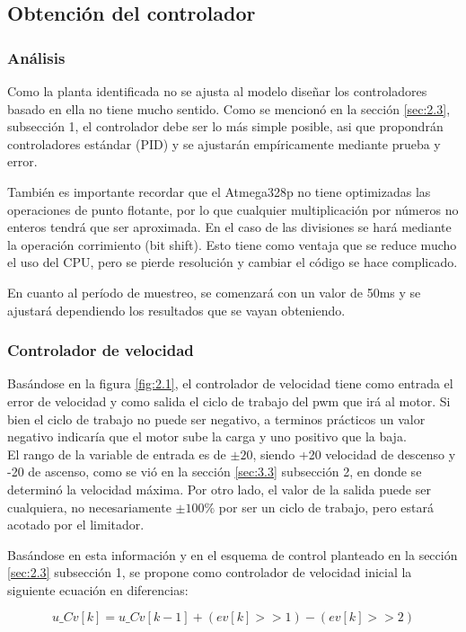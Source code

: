 \subsection{Obtención del controlador}
\subsubsection{Análisis}
Como la planta identificada no se ajusta al modelo diseñar los controladores basado en ella no tiene mucho sentido. Como se mencionó en la sección \ref{sec:2.3}, subsección 1, el controlador debe ser lo más simple posible, asi que propondrán controladores estándar (PID) y se ajustarán empíricamente mediante prueba y error.

También es importante recordar que el Atmega328p no tiene optimizadas las operaciones de punto flotante, por lo que cualquier multiplicación por números no enteros tendrá que ser aproximada. En el caso de las divisiones se hará mediante la operación corrimiento (bit shift). Esto tiene como ventaja que se reduce mucho el uso del CPU, pero se pierde resolución y cambiar el código se hace complicado.

En cuanto al período de muestreo, se comenzará con un valor de 50ms y se ajustará dependiendo los resultados que se vayan obteniendo.

\subsubsection{Controlador de velocidad}
Basándose en la figura \ref{fig:2.1}, el controlador de velocidad tiene como entrada el error de velocidad y como salida el ciclo de trabajo del pwm que irá al motor. Si bien el ciclo de trabajo no puede ser negativo, a terminos prácticos un valor negativo indicaría que el motor sube la carga y uno positivo que la baja.\\
El rango de la variable de entrada es de \(\pm 20\), siendo +20 velocidad de descenso y -20 de ascenso, como se vió en la sección \ref{sec:3.3} subsección 2, en donde se determinó la velocidad máxima. Por otro lado, el valor de la salida puede ser cualquiera, no necesariamente \(\pm 100\% \) por ser un ciclo de trabajo, pero estará acotado por el limitador.

Basándose en esta información y en el esquema de control planteado en la sección \ref{sec:2.3} subsección 1, se propone como controlador de velocidad inicial la siguiente ecuación en diferencias:

\[u\_Cv[k] = u\_Cv[k-1] + (ev[k] >> 1) - (ev[k] >> 2)\]

